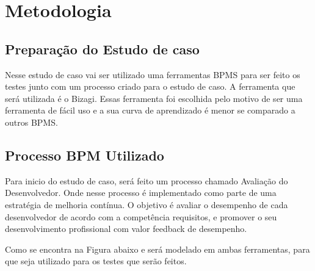 \chapter{Metodologia}
\label{chap:Metodologia}

\section{Preparação do Estudo de caso}
\label{chap:Preparação}
Nesse estudo de caso vai ser utilizado uma ferramentas BPMS para ser feito os testes junto com um processo criado para o estudo de caso. A ferramenta que será utilizada é o Bizagi. Essas ferramenta foi escolhida pelo motivo de ser uma ferramenta de fácil uso e a sua curva de aprendizado é menor se comparado a outros BPMS.



\section{Processo BPM Utilizado}
\label{chap:Processo-Utilizado}
Para inicio do estudo de caso, será feito um processo chamado Avaliação do Desenvolvedor. Onde nesse processo é implementado como parte de uma estratégia de melhoria contínua. O objetivo é avaliar o desempenho de cada desenvolvedor de acordo com a competência requisitos, e promover o seu desenvolvimento profissional com valor feedback de desempenho.
 


Como se encontra na Figura abaixo e será modelado em ambas ferramentas, para que seja utilizado para os testes que serão feitos. 

\begin{figure}[h!]
	\centering
       	{
		}	
	\end{figure}
    
